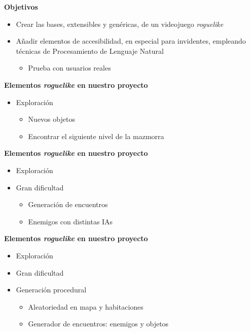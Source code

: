 
\begin{tframe}{\textbf{Objetivos}}
	\begin{itemize}
		\item Crear las bases, extensibles y genéricas, de un videojuego \textit{roguelike}
		\item<+-| alert@+> Añadir elementos de accesibilidad, en especial para invidentes, empleando técnicas de Procesamiento de Lenguaje Natural
		\begin{itemize}
			\item Prueba con usuarios reales
		\end{itemize}
	\end{itemize}
\end{tframe}


\begin{tframe}{\textbf{Elementos \textit{roguelike} en nuestro proyecto}}
	\begin{itemize}
		\item<+-| alert@+> Exploración
			\begin{itemize}
				\item Nuevos objetos
				\item Encontrar el siguiente nivel de la mazmorra
			\end{itemize}
	\end{itemize}
\end{tframe}

\begin{tframe}{\textbf{Elementos \textit{roguelike} en nuestro proyecto}}
	\begin{itemize}
		\item Exploración
		\item<+-| alert@+> Gran dificultad
		\begin{itemize}
			\item Generación de encuentros
			\item Enemigos con distintas IAs
		\end{itemize}
	\end{itemize}
\end{tframe}

\begin{tframe}{\textbf{Elementos \textit{roguelike} en nuestro proyecto}}
	\begin{itemize}
		\item Exploración
		\item Gran dificultad
		\item<+-| alert@+> Generación procedural
		\begin{itemize}
			\item Aleatoriedad en mapa y habitaciones
			\item Generador de encuentros: enemigos y objetos
		\end{itemize}
	\end{itemize}
\end{tframe}

